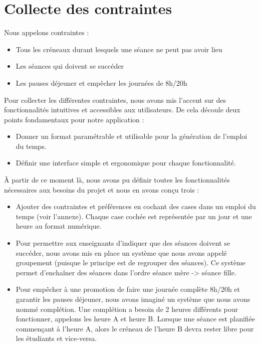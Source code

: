 \documentclass[12pt,a4paper,openany]{memoir}
\begin{document}
\section{Collecte des contraintes}
\par
Nous appelons contraintes :
    \begin{itemize}
    \item Tous les créneaux durant lesquels une séance ne peut pas avoir lieu
    \item Les séances qui doivent se succéder
    \item Les pauses déjeuner et empêcher les journées de 8h/20h 
    \end{itemize}
Pour collecter les différentes contraintes, nous avons mis l'accent sur des fonctionnalités intuitives et accessibles aux utilisateurs. De cela découle deux points fondamentaux pour notre application :
\begin{itemize}
	\item Donner un format paramétrable et utilisable pour la génération de l'emploi du temps.
	\item Définir une interface simple et ergonomique pour chaque fonctionnalité.
\end{itemize}
\par
À partir de ce moment là, nous avons pu définir toutes les fonctionnalités nécessaires aux besoins du projet et nous en avons conçu trois : 
\begin{itemize}
	\item Ajouter des contraintes et préférences en cochant des cases dans un emploi du temps (voir l'annexe). Chaque case cochée est représentée par un jour et une heure au format numérique.
	\item Pour permettre aux enseignants d'indiquer que des séances doivent se succéder, nous avons mis en place un système que nous avons appelé groupement (puisque le principe est de regrouper des séances).
	Ce système permet d'enchaîner des séances dans l'ordre séance mère -> séance fille.
	\item Pour empêcher à une promotion de faire une journée complète 8h/20h et garantir les pauses déjeuner, nous avons imaginé un système que nous avons nommé complétion.
	Une complétion a besoin de 2 heures différents pour fonctionner, appelons les heure A et heure B. Lorsque une séance est planifiée commençant à l'heure A, alors le créneau de l'heure B devra rester libre pour les étudiants et vice-versa.
\end{itemize} 
\end{document}

